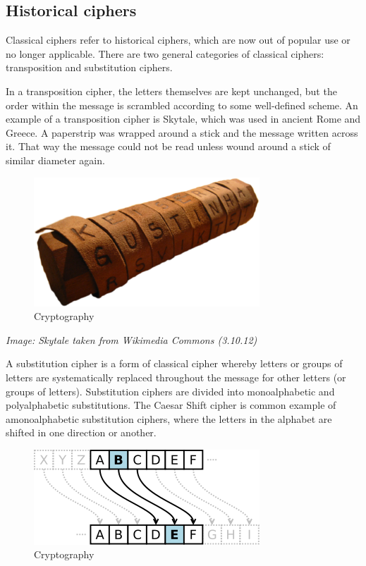 \subsection{Historical ciphers}

Classical ciphers refer to historical ciphers, which are now out of
popular use or no longer applicable. There are two general categories of
classical ciphers: transposition and substitution ciphers.

In a transposition cipher, the letters themselves are kept unchanged,
but the order within the message is scrambled according to some
well-defined scheme. An example of a transposition cipher is Skytale,
which was used in ancient Rome and Greece. A paperstrip was wrapped
around a stick and the message written across it. That way the message
could not be read unless wound around a stick of similar diameter again.

\begin{figure}[htbp]
\centering
\includegraphics{crypto_1.png}
\caption{Cryptography}
\end{figure}

\emph{Image: Skytale taken from Wikimedia Commons (3.10.12)}

A substitution cipher is a form of classical cipher whereby letters or
groups of letters are systematically replaced throughout the message for
other letters (or groups of letters). Substitution ciphers are divided
into monoalphabetic and polyalphabetic substitutions. The Caesar Shift
cipher is common example of amonoalphabetic substitution ciphers, where
the letters in the alphabet are shifted in one direction or another.

\begin{figure}[htbp]
\centering
\includegraphics{crypto_2.png}
\caption{Cryptography}
\end{figure}

